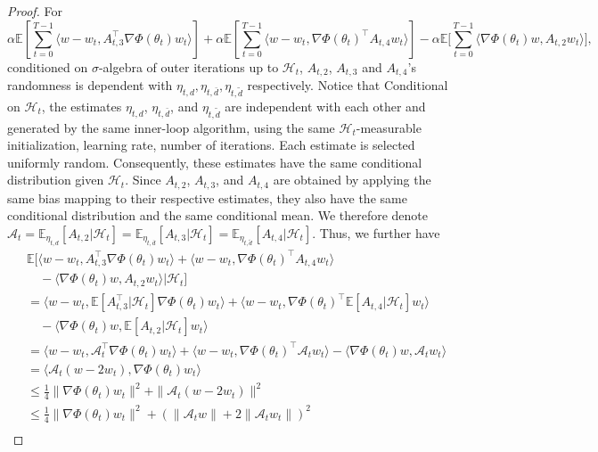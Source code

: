 \documentclass[twoside]{article} %
\theoremstyle{plain}
\theoremstyle{definition}
\theoremstyle{remark}
\newcommand{\calH}{\mathcal{H}}
\begin{document}
\begin{proof}
For 
$$\alpha\mathbb{E}[\sum_{t=0}^{T-1}\langle w-w_t, A_{t,3}^{\top}\nabla \Phi(\theta_t)w_t  \rangle]+\alpha \mathbb{E}[\sum_{t=0}^{T-1}\langle w-w_t, \nabla \Phi(\theta_t)^{\top}A_{t,4}w_t \rangle] -\alpha \mathbb{E}\big[\sum_{t=0}^{T-1}\langle \nabla \Phi(\theta_t)w, A_{t,2}w_t \rangle \big],$$ conditioned on $\sigma$-algebra of outer iterations up to $\calH_t$, $A_{t,2}$, $A_{t,3}$ and $A_{t,4}$'s randomness is dependent with $\eta_{t,d}, \eta_{t, \bar{d}}, \eta_{t,\tilde{d}}$ respectively.  Notice that Conditional on $\calH_t$, the estimates $\eta_{t,d}$, $\eta_{t,\bar d}$, and $\eta_{t,\tilde d}$ are independent with each other and generated by the same inner-loop algorithm, using the same $\calH_t$-measurable initialization, learning rate, number of iterations. Each estimate is selected uniformly random. Consequently, these estimates have the same conditional distribution given $\calH_t$. Since $A_{t,2}$, $A_{t,3}$, and $A_{t,4}$ are obtained by applying the same bias mapping to their respective estimates, they also have the same conditional distribution and the same conditional mean. We therefore denote $\mathcal{A}_t=\mathbb{E}_{\eta_{t,d}}[A_{t,2}|\calH_t] = \mathbb{E}_{\eta_{t,\bar{d}}}[A_{t,3}|\calH_t] = \mathbb{E}_{\eta_{t,\tilde{d}}}[A_{t,4}|\calH_t]$. Thus, we further have
\begin{align}
    &\mathbb{E}\big[ \langle w-w_t, A_{t,3}^{\top}\nabla \Phi(\theta_t)w_t  \rangle+ \langle w-w_t, \nabla \Phi(\theta_t)^{\top}A_{t,4}w_t  \rangle \nonumber\\ 
    &\quad - \langle \nabla \Phi(\theta_t)w, A_{t,2}w_t \rangle |\calH_t\big]\nonumber\\
    & = \langle w-w_t, \mathbb{E}[A_{t,3}^{\top}|\calH_t]\nabla \Phi(\theta_t)w_t  \rangle + \langle w-w_t, \nabla \Phi(\theta_t)^{\top} \mathbb{E}[A_{t,4}|\calH_t]w_t \rangle \nonumber \\
    &\quad -\langle\nabla \Phi(\theta_t)w,\mathbb{E}[A_{t,2}|\calH_t]w_t \rangle \nonumber\\
    & = \langle w-w_t, \mathcal{A}_t^{\top}\nabla \Phi(\theta_t)w_t  \rangle + \langle w-w_t, \nabla \Phi(\theta_t)^{\top} \mathcal{A}_tw_t \rangle -\langle\nabla \Phi(\theta_t)w,\mathcal{A}_tw_t \rangle \nonumber\\
    & = \langle \mathcal{A}_t(w-2w_t), \nabla \Phi(\theta_t)w_t \rangle\nonumber\\
    & \leq \frac{1}{4}\|\nabla \Phi(\theta_t)w_t \|^2 + \|\mathcal{A}_t(w-2w_t)\|^2\nonumber\\
    & \leq  \frac{1}{4}\|\nabla \Phi(\theta_t)w_t \|^2+(\|\mathcal{A}_tw\| + 2\|\mathcal{A}_tw_t\|)^2\nonumber\\

\end{align}
\end{proof}
\end{document}
